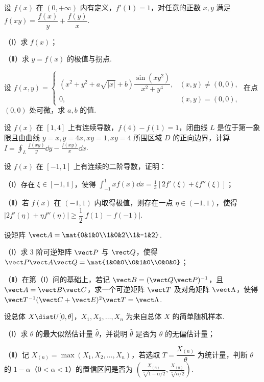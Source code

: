 \begin{question}[index=17,points=10]
设 $f(x)$ 在 $(0,+\infty)$ 内有定义，$f'(1)=1$，对任意的正数 $x,y$ 满足 $f(xy)=\dfrac{f(x)}y+\dfrac{f(y)}x$.
\par（Ⅰ）求 $f(x)$；
\par（Ⅱ）求 $y=f(x)$ 的极值与拐点.
\end{question}
\QuestionBreak\WorkSpace

\begin{question}[index=18,points=12]
设 $f(x,y)=\begin{cases}\left(x^2+y^2+a\sqrt{|x|}+b\right)\dfrac{\sin(xy^2)}{x^2+y^4},&(x,y)\ne(0,0),\\0,&(x,y)=(0,0),\end{cases}$ 在点 $(0,0)$ 处可微，求 $a,b$ 的值.
\end{question}
\QuestionBreak\WorkSpace\WorkPageBreak

\begin{question}[index=19,points=12]
设 $f(x)$ 在 $[1,4]$ 上有连续导数，$f(4)-f(1)=1$，闭曲线 $L$ 是位于第一象限且由曲线 $y=x,y=4x,xy=1,xy=4$ 所围区域 $D$ 的正向边界，计算 $\displaystyle I=\oint_L\frac{f(xy)}y\dd y-\frac{f(xy)}x\dd x$.
\end{question}
\QuestionBreak\WorkSpace

\begin{question}[index=20,points=12]
设 $f(x)$ 在 $[-1,1]$ 上有连续的二阶导数，证明：
\par（Ⅰ）存在 $\xi\in[-1,1]$，使得 $\displaystyle\int_{-1}^1xf(x)\dd x=\frac13[2f'(\xi)+\xi f''(\xi)]$；
\par（Ⅱ）若 $f(x)$ 在 $(-1,1)$ 内取得极值，则存在一点 $\eta\in(-1,1)$，使得 $|2f'(\eta)+\eta f''(\eta)|\ge\dfrac12|f(1)-f(-1)|$.
\end{question}
\QuestionBreak\WorkSpace\WorkPageBreak

\begin{question}[index=21,points=12]
设矩阵 $\vect A=\mat{0&1&0\\1&0&2\\1&-1&2}$.
\par（Ⅰ）求 $3$ 阶可逆矩阵 $\vect P$ 与 $\vect Q$，使得 $\vect P\vect A\vect Q=\mat{1&0&0\\0&1&0\\0&0&0}$；
\par（Ⅱ）在第（Ⅰ）问的基础上，若记 $\vect B=(\vect Q\vect P)^{-1}$，且 $\vect A=\vect B\vect C$，求一个可逆矩阵 $\vect T$ 及对角矩阵 $\vect\Lambda$，使得 $\vect T^{-1}(\vect C+\vect E)^2\vect T=\vect\Lambda$.
\end{question}
\QuestionBreak\WorkSpace

\begin{question}[index=22,points=12]
设总体 $X\dist U[0,\theta]$，$X_1,X_2,\ldots,X_n$ 为来自总体 $X$ 的简单随机样本.
\par（Ⅰ）求 $\theta$ 的最大似然估计量 $\widehat\theta$，并说明 $\widehat\theta$ 是否为 $\theta$ 的无偏估计量；
\par（Ⅱ）记 $X_{(n)}=\max(X_1,X_2,\ldots,X_n)$，若选取 $T=\dfrac{X_{(n)}}\theta$ 为统计量，判断 $\theta$ 的 $1-\alpha$（$0<\alpha<1$）的置信区间是否为 $\displaystyle\left(\frac{X_{(n)}}{\sqrt[n]{1-\alpha/2}},\frac{X_{(n)}}{\sqrt[n]{\alpha/2}}\right)$.
\end{question}
\WorkSpace
